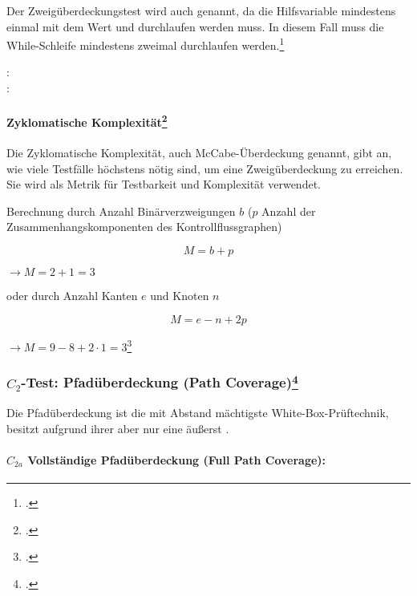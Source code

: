 \documentclass{bschlangaul-theorie}
\begin{document}
Der Zweigüberdeckungstest wird auch
 genannt, da die Hilfsvariable
mindestens einmal mit dem Wert  und 
durchlaufen werden muss. In diesem Fall muss die While-Schleife
mindestens zweimal durchlaufen werden.\footcite{wiki:kontrollfluss-test}

\beispiel

\noindent
{}: \\
: 

%

\paragraph{Zyklomatische Komplexität\footcite[Seite 38]{sosy:fs:5}}

Die Zyklomatische Komplexität, auch McCabe-Überdeckung genannt, gibt an,
wie viele Testfälle höchstens nötig sind, um eine Zweigüberdeckung zu
erreichen. Sie wird als Metrik für Testbarkeit und Komplexität
verwendet.

\noindent
Berechnung durch Anzahl Binärverzweigungen $b$ ($p$ Anzahl der
Zusammenhangskomponenten des Kontrollflussgraphen)

\begin{displaymath}
M = b + p
\end{displaymath}

$\rightarrow M = 2 + 1 = 3$

\noindent
oder durch Anzahl Kanten $e$ und Knoten $n$

\begin{displaymath}
M = e - n + 2p
\end{displaymath}

$\rightarrow M = 9 - 8 + 2 \cdot 1 = 3$\footcite[Kapitel 4.4.6
McCabe-Überdeckung, Seite 216-220]{hoffmann:software}

%

\subsubsection{$C_2$-Test: Pfadüberdeckung (Path Coverage)\footcite[Seite 39]{sosy:fs:5}}

Die Pfadüberdeckung ist die mit Abstand mächtigste
White-Box-Prüftechnik, besitzt aufgrund ihrer  aber nur eine äußerst .

%

\paragraph{$C_{2a}$ Vollständige Pfadüberdeckung (Full Path Coverage):}
\end{document}
